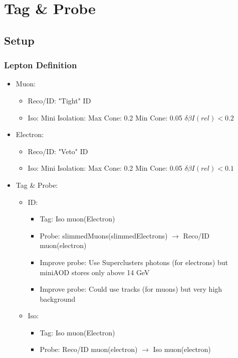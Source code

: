\documentclass{beamer}
\begin{document}
\section{Tag \& Probe}
\subsection{Setup}
\begin{frame}
\frametitle{Lepton Definition}
\begin{itemize}
 \item Muon:
 \begin{itemize}
  \item Reco/ID: "Tight" ID
  \item Iso: Mini Isolation: Max Cone: 0.2 Min Cone: 0.05 $\delta \beta I(rel)<0.2$
 \end{itemize}
  \item Electron:
 \begin{itemize}
  \item Reco/ID: "Veto" ID
  \item Iso: Mini Isolation: Max Cone: 0.2 Min Cone: 0.05 $\delta \beta I(rel)<0.1$
 \end{itemize}
 \item Tag \& Probe:
 \begin{itemize}
 \item ID:
 \begin{itemize}
  \item Tag: Iso muon(Electron)
  \item Probe: slimmedMuons(slimmedElectrons) $\rightarrow$ Reco/ID muon(electron)
  \item Improve probe: Use Superclusters photons (for electrons) but miniAOD stores only above  14 GeV
  \item Improve probe: Could use tracks (for muons) but very high background
 \end{itemize}
  \item Iso:
 \begin{itemize}
  \item Tag: Iso muon(Electron)
  \item Probe: Reco/ID muon(electron) $\rightarrow$ Iso muon(electron)
  
 \end{itemize}

 \end{itemize}
\end{itemize}
\end{frame}
\end{document}
